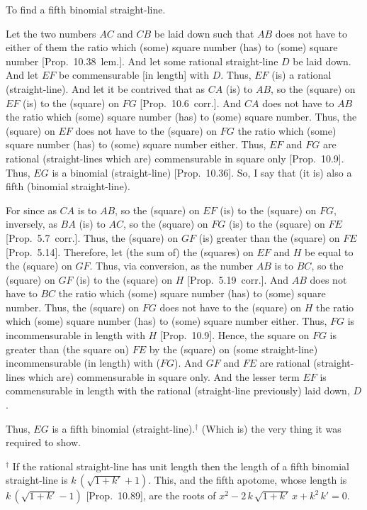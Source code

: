 \begin{Parallel}{}{}
{To find a fifth binomial straight-line.

\epsfysize=1.3in
\centerline{}

Let the two numbers $AC$ and $CB$ be laid down such that $AB$ does
not have to either of them the ratio which (some) square number (has)
to (some) square number [Prop.~10.38~lem.]. And
let some rational straight-line $D$ be laid down. And let $EF$ be
commensurable [in length] with $D$. Thus, $EF$ (is) a rational (straight-line).
And let it be contrived that as $CA$ (is) to $AB$, so the (square) on
$EF$ (is) to the (square) on $FG$ [Prop.~10.6~corr.].
 And $CA$ does not have to $AB$ the ratio which (some)
 square number (has) to (some) square number. Thus, the (square) on
 $EF$ does not have to the (square) on $FG$ the ratio which (some)
 square number (has) to (some) square number either. Thus, $EF$ and
 $FG$ are rational (straight-lines which are) commensurable in square only
 [Prop.~10.9].  Thus, $EG$ is a binomial (straight-line) [Prop.~10.36]. So, I say that (it is) also
 a fifth (binomial straight-line).
 
 For since as $CA$ is to $AB$, so the (square) on $EF$ (is) to the (square)
 on $FG$, inversely, as $BA$ (is) to $AC$, so the (square) on $FG$ (is)
 to the (square) on $FE$ [Prop.~5.7~corr.]. Thus,
 the (square) on $GF$ (is) greater than the (square) on $FE$ [Prop.~5.14]. Therefore, let (the sum of) the (squares)
 on $EF$ and $H$ be equal to the (square) on $GF$. Thus, via conversion, 
 as the number $AB$ is to $BC$, so the (square) on $GF$ (is) to
 the (square) on $H$ [Prop.~5.19~corr.]. 
 And $AB$ does not have to $BC$ the ratio which (some) square number
 (has) to (some) square number. Thus, the (square) on $FG$ does not have
 to the (square) on $H$ the ratio which (some) square number (has) to
 (some) square number either. Thus, $FG$ is incommensurable in length
 with $H$ [Prop.~10.9]. Hence, the square on $FG$
 is greater than (the square on) $FE$ by the (square) on (some straight-line)
 incommensurable (in length) with ($FG$). And $GF$ and $FE$ are rational (straight-lines
 which are) commensurable in square only. And the lesser term $EF$ is commensurable in length with the  rational (straight-line previously)  laid down, $D$.
 
 Thus, $EG$ is a fifth binomial (straight-line).$^\dag$  (Which is) the very thing it
 was required to show.}
\end{Parallel}
{\footnotesize\noindent $^\dag$ If the rational straight-line has unit length then the length of a fifth binomial straight-line
is  $k\,(\sqrt{1+k'}+1)$. This, and the fifth apotome,
whose length is $k\,(\sqrt{1+k'}-1)$ [Prop.~10.89],
are the roots of $x^2- 2\,k\,\sqrt{1+k'}\,x+k^2\,k'=0$.}
 
